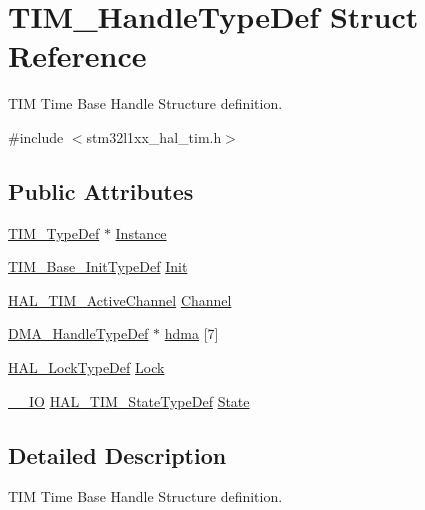 \hypertarget{struct_t_i_m___handle_type_def}{\section{T\-I\-M\-\_\-\-Handle\-Type\-Def Struct Reference}
\label{struct_t_i_m___handle_type_def}
}


T\-I\-M Time Base Handle Structure definition.  




{\ttfamily \#include $<$stm32l1xx\-\_\-hal\-\_\-tim.\-h$>$}

\subsection*{Public Attributes}
\begin{DoxyCompactItemize}
\item 
\hyperlink{struct_t_i_m___type_def}{T\-I\-M\-\_\-\-Type\-Def} $\ast$ \hyperlink{struct_t_i_m___handle_type_def_ad0c5f736a15f6d8d14724854c8133bcc}{Instance}
\item 
\hyperlink{struct_t_i_m___base___init_type_def}{T\-I\-M\-\_\-\-Base\-\_\-\-Init\-Type\-Def} \hyperlink{struct_t_i_m___handle_type_def_a8b2e61c3c4128e62cb7be7d35048152e}{Init}
\item 
\hyperlink{group___t_i_m___exported___types_gaa3fa7bcbb4707f1151ccfc90a8cf9706}{H\-A\-L\-\_\-\-T\-I\-M\-\_\-\-Active\-Channel} \hyperlink{struct_t_i_m___handle_type_def_ae9c5a11c1f5b27c808c0aca453e63870}{Channel}
\item 
\hyperlink{group___d_m_a___exported___types_ga92b907d56a9c29b93d46782a7a04f91e}{D\-M\-A\-\_\-\-Handle\-Type\-Def} $\ast$ \hyperlink{struct_t_i_m___handle_type_def_a15338c71de82fa178c685be868e694bd}{hdma} \mbox{[}7\mbox{]}
\item 
\hyperlink{stm32l1xx__hal__def_8h_ab367482e943333a1299294eadaad284b}{H\-A\-L\-\_\-\-Lock\-Type\-Def} \hyperlink{struct_t_i_m___handle_type_def_a2a24b963b57150ed2fb0f051cd87b65a}{Lock}
\item 
\hyperlink{core__sc300_8h_aec43007d9998a0a0e01faede4133d6be}{\-\_\-\-\_\-\-I\-O} \hyperlink{group___t_i_m___exported___types_gae0994cf5970e56ca4903e9151f40010c}{H\-A\-L\-\_\-\-T\-I\-M\-\_\-\-State\-Type\-Def} \hyperlink{struct_t_i_m___handle_type_def_a6b6eeaf94f2e6e3d0a5bdac44adf21d6}{State}
\end{DoxyCompactItemize}


\subsection{Detailed Description}
T\-I\-M Time Base Handle Structure definition. 

